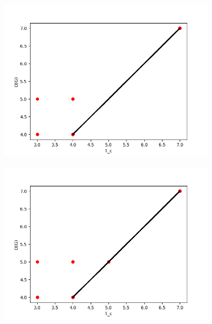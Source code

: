\documentclass{llncs}
\begin{document}
\begin{figure}\label{pic:diagram}
\begin{subfigure}{0.5\linewidth}
\centering\includegraphics[scale=0.4]{images/100-consistency-convergence.png}
\end{subfigure}
\begin{subfigure}{0.5\linewidth}
\centering\includegraphics[scale=0.4]{images/200-consistency-convergence.png}
\end{subfigure}
\begin{subfigure}{0.5\linewidth}

\end{subfigure}
\end{figure}
\end{document}
